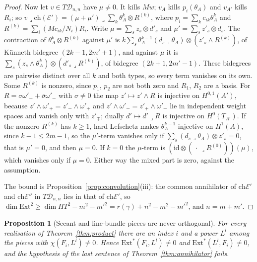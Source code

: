 \documentclass[11pt,reqno]{amsart}
\numberwithin{equation}{section}
\theoremstyle{plain}
\newtheorem{proposition}[theorem]{Proposition}
\theoremstyle{definition}
\newcommand{\Ext}{\mathrm{Ext}}
\newcommand{\ch}{\mathrm{ch}}
\newcommand{\cD}{\mathcal{D}}
\begin{document}
\begin{proof}
Now let $v\in T\cD_{n,n}$ have $\mu\ne0$. It kills $Mw$; $v_{A}$ kills $p_{i}(\theta_{A})$ and $v_{A'}$ kills $R_{i}$; so $v\lrcorner\ch(\mathcal{E}')=(\mu+\mu')\lrcorner\sum_{k}\theta_{A}^{k}\otimes R^{(k)}$, where $p_{i}=\sum_{k}c_{ik}\theta_{A}^{k}$ and $R^{(k)}=\sum_{i}(Mc_{ik}/N_{i})R_{i}$. Write $\mu=\sum_{s}z_{s}\otimes d'_{s}$ and $\mu'=\sum_{s}z'_{s}\otimes d_{s}$. The contraction of $\theta_{A}^{k}\otimes R^{(k)}$ against $\mu'$ is $k\sum_{s}\theta_{A}^{k-1}(d_{s}\lrcorner\theta_{A})\otimes(z'_{s}\wedge R^{(k)})$, of K\"unneth bidegree $(2k-1,2m'+1)$, and against $\mu$ it is $\sum_{s}(z_{s}\wedge\theta_{A}^{k})\otimes(d'_{s}\lrcorner R^{(k)})$, of bidegree $(2k+1,2m'-1)$. These bidegrees are pairwise distinct over all $k$ and both types, so every term vanishes on its own. Some $R^{(k)}$ is nonzero, since $p_{1}$, $p_{2}$ are not both zero and $R_{1}$, $R_{2}$ are a basis. For $R=\sigma\omega'_{+}+\bar\sigma\omega'_{-}$ with $\sigma\ne0$ the map $z'\mapsto z'\wedge R$ is injective on $H^{0,1}(A')$, because $z'\wedge\omega'_{+}=z'_{-}\wedge\omega'_{+}$ and $z'\wedge\omega'_{-}=z'_{+}\wedge\omega'_{-}$ lie in independent weight spaces and vanish only with $z'_{\mp}$; dually $d'\mapsto d'\lrcorner R$ is injective on $H^{0}(T_{A'})$. If the nonzero $R^{(k)}$ has $k\ge1$, hard Lefschetz makes $\theta_{A}^{k-1}$ injective on $H^{1}(A)$, since $k-1\le2m-1$, so the $\mu'$-term vanishes only if $\sum_{s}(d_{s}\lrcorner\theta_{A})\otimes z'_{s}=0$, that is $\mu'=0$, and then $\mu=0$. If $k=0$ the $\mu$-term is $(\mathrm{id}\otimes(\,\cdot\,\lrcorner R^{(0)}))(\mu)$, which vanishes only if $\mu=0$. Either way the mixed part is zero, against the assumption.

The bound is Proposition~\ref{prop:convolution}(iii): the common annihilator of $\ch\mathcal{E}'$ and $\ch\mathcal{E}''$ in $T\cD_{n,n}$ lies in that of $\ch\mathcal{E}'$, so $\dim\Ext^{2}\ge\dim HT^{2}-m^{2}-m'^{2}=r(\gamma)+n^{2}-m^{2}-m'^{2}$, and $n=m+m'$.
\end{proof}

\begin{proposition}[Secant and line-bundle pieces are never orthogonal]\label{prop:noorth}
For every realisation of Theorem~\ref{thm:product} there are an index $i$ and a power $L^{l}$ among the pieces with $\chi(F_{i},L^{l})\ne0$. Hence $\Ext^{*}(F_{i},L^{l})\ne0$ and $\Ext^{*}(L^{l},F_{i})\ne0$, and the hypothesis of the last sentence of Theorem~\ref{thm:annihilator} fails.
\end{proposition}
\end{document}

